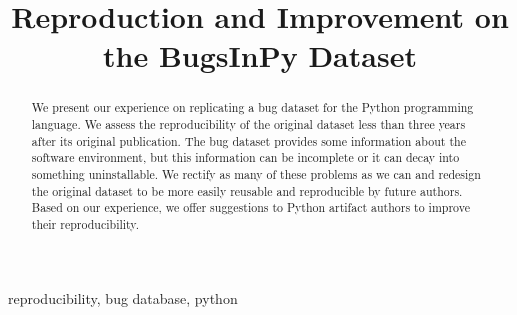 \documentclass[conference]{IEEEtran}
\begin{document}
\title{Reproduction and Improvement on the BugsInPy Dataset}

\author{
\and  
{}
\and
{}
}

\maketitle

\begin{abstract}
  We present our experience on replicating a bug dataset for the Python programming language.
  We assess the reproducibility of the original dataset less than three years after its original publication.
  The bug dataset provides some information about the software environment, but this information can be incomplete or it can decay into something uninstallable.
  We rectify as many of these problems as we can and redesign the original dataset to be more easily reusable and reproducible by future authors.
  Based on our experience, we offer suggestions to Python artifact authors to improve their reproducibility. 
\end{abstract}

\begin{IEEEkeywords}
reproducibility, bug database, python
\end{IEEEkeywords}





\printbibliography
\end{document}
